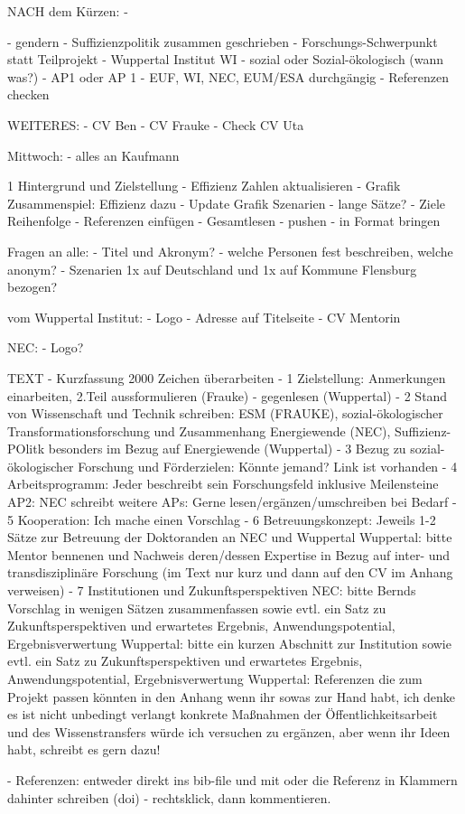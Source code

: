 NACH dem Kürzen:
- %

- gendern
- Suffizienzpolitik zusammen geschrieben
- Forschungs-Schwerpunkt statt Teilprojekt
- Wuppertal Institut WI
- sozial oder Sozial-ökologisch (wann was?)
- AP1 oder AP 1
- EUF, WI, NEC, EUM/ESA durchgängig
- Referenzen checken


WEITERES:
- CV Ben
- CV Frauke
- Check CV Uta

Mittwoch:
- alles an Kaufmann




1 Hintergrund und Zielstellung
- Effizienz Zahlen aktualisieren
- Grafik Zusammenspiel: Effizienz dazu
- Update Grafik Szenarien
- lange Sätze?
- Ziele Reihenfolge
- Referenzen einfügen
- Gesamtlesen
- pushen
- in Format bringen


Fragen an alle:
- Titel und Akronym?
- welche Personen fest beschreiben, welche anonym?
- Szenarien 1x auf Deutschland und 1x auf Kommune Flensburg bezogen?

vom Wuppertal Institut:
- Logo
- Adresse auf Titelseite
- CV Mentorin


NEC:
- Logo?


TEXT
- Kurzfassung 2000 Zeichen überarbeiten
- 1 Zielstellung: Anmerkungen einarbeiten, 2.Teil aussformulieren (Frauke) - gegenlesen (Wuppertal)
- 2 Stand von Wissenschaft und Technik schreiben: ESM (FRAUKE), sozial-ökologischer Transformationsforschung und Zusammenhang Energiewende (NEC), Suffizienz-POlitk besonders im Bezug auf Energiewende (Wuppertal)
- 3 Bezug zu sozial-ökologischer Forschung und Förderzielen: Könnte jemand? Link ist vorhanden
- 4 Arbeitsprogramm:
Jeder beschreibt sein Forschungsfeld inklusive Meilensteine
AP2: NEC schreibt
weitere APs: Gerne lesen/ergänzen/umschreiben bei Bedarf
- 5 Kooperation: Ich mache einen Vorschlag
- 6 Betreuungskonzept:
Jeweils 1-2 Sätze zur Betreuung der Doktoranden an NEC und Wuppertal
Wuppertal: bitte Mentor bennenen und Nachweis deren/dessen Expertise in Bezug auf inter- und transdisziplinäre Forschung (im Text nur kurz und dann auf den CV im Anhang verweisen)
- 7 Institutionen und Zukunftsperspektiven
NEC: bitte Bernds Vorschlag in wenigen Sätzen zusammenfassen sowie evtl. ein Satz zu Zukunftsperspektiven und erwartetes Ergebnis, Anwendungspotential, Ergebnisverwertung
Wuppertal: bitte ein kurzen Abschnitt zur Institution sowie evtl. ein Satz zu Zukunftsperspektiven und erwartetes Ergebnis, Anwendungspotential, Ergebnisverwertung
Wuppertal: Referenzen die zum Projekt passen könnten in den Anhang wenn ihr sowas zur Hand habt, ich denke es ist nicht unbedingt verlangt
konkrete Maßnahmen der Öffentlichkeitsarbeit und des Wissenstransfers würde ich versuchen zu ergänzen, aber wenn ihr Ideen habt, schreibt es gern dazu!


- Referenzen: entweder direkt ins bib-file und mit \cite{}  oder die Referenz in Klammern dahinter schreiben (doi)
- rechtsklick, dann kommentieren.